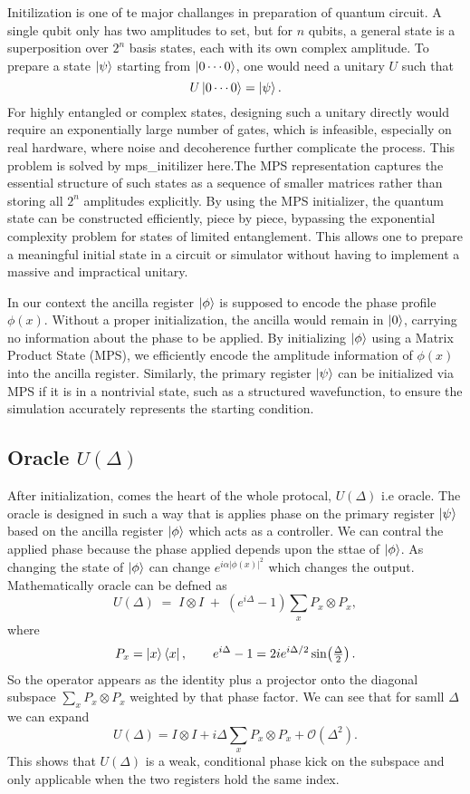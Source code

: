 \documentclass[12pt,a4paper]{article}
\begin{document}
Initilization is one of te major challanges in preparation of quantum circuit. A single qubit only has two amplitudes to set, but for $n$ qubits, a general state is a superposition over $2^n$ basis states, each with its own complex amplitude. To prepare a state $\ket{\psi}$ starting from $\ket{0\cdots 0}$, one would need a unitary $U$ such that
\[
U \ket{0\cdots 0} = \ket{\psi}.
\]
For highly entangled or complex states, designing such a unitary directly would require an exponentially large number of gates, which is infeasible, especially on real hardware, where noise and decoherence further complicate the process. This problem is solved by mps\_initilizer here.The MPS representation captures the essential structure of such states as a sequence of smaller matrices rather than storing all $2^n$ amplitudes explicitly. 
By using the MPS initializer, the quantum state can be constructed efficiently, piece by piece, bypassing the exponential complexity problem for states of limited entanglement.
This allows one to prepare a meaningful initial state in a circuit or simulator without having to implement a massive and impractical unitary.

In our context the ancilla register $\ket{\phi}$ is supposed to encode the phase profile $\phi(x)$. Without a proper initialization, the ancilla would remain in $\ket{0}$, carrying no information about the phase to be applied. By initializing $\ket{\phi}$ using a Matrix Product State (MPS), we efficiently encode the amplitude information of $\phi(x)$ into the ancilla register. Similarly, the primary register $\ket{\psi}$ can be initialized via MPS if it is in a nontrivial state, such as a structured wavefunction, to ensure the simulation accurately represents the starting condition.

\newpage
\subsection{Oracle $U(\Delta)$}

After initialization, comes the heart of the whole protocal, $U(\Delta)$ i.e oracle. The oracle is designed in such a way that is applies phase on the primary register $\ket{\psi}$ based on the ancilla register $\ket{\phi}$ which acts as a controller. We can contral the applied phase because the phase applied depends upon the sttae of $\ket{\phi}$. As changing the state of $\ket{\phi}$ can change $e^{i\alpha \lvert \phi(x)\rvert^2}$ which changes the output.
\setlength{\parskip}{1em}
Mathematically oracle can be defned as 
\[
U(\Delta) \;=\; I \otimes I \;+\; (e^{i\Delta} - 1) \sum_x P_x \otimes P_x ,
\]
where 
\[
P_x = \ket{x}\bra{x}, 
\qquad 
e^{i\Delta} - 1 = 2 i e^{i\Delta/2} \sin\!\left(\tfrac{\Delta}{2}\right).
\]
So the operator appears as the identity plus a projector onto the diagonal subspace 
$\sum_x P_x \otimes P_x$ weighted by that phase factor. We can see that for samll $\Delta$ we can expand
\[
U(\Delta) = I \otimes I + i \Delta \sum_x P_x \otimes P_x + \mathcal{O}(\Delta^2).
\]
This shows that $U(\Delta)$ is a weak, conditional phase kick on the subspace and only applicable when the two 
registers hold the same index.
\end{document}
